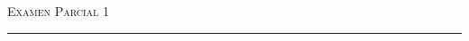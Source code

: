 \documentclass[11pt]{article}
\date{}
\newcommand{\myTitle}{Examen Parcial 1}
\theoremstyle{Tema} \newtheorem{Tema}{Tema} %
\theoremstyle{Tema} \newtheorem{Serie}{Serie}              %
\theoremstyle{Tema} \newtheorem{Ejercicio}{Ejercicio}    %
\begin{document}
\pagestyle{allStyle}

\thispagestyle{firststyle}
\begin{center}
\LARGE
\textsc{\myTitle} %
\medskip
\hrule height 1.5pt
\end{center}


\vspace{0.1 in}




\end{document}

